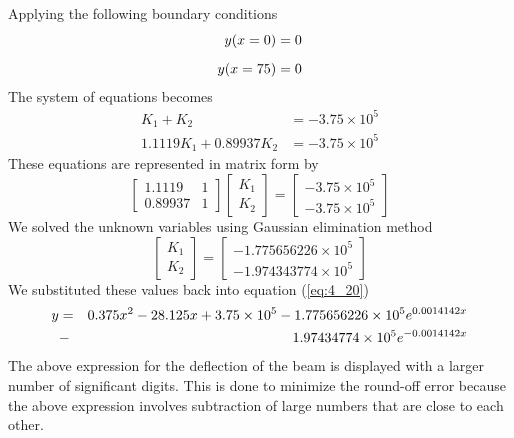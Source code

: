 \documentclass[12pt]{report}
\newcommand{\sps}{\\[0.2cm]}
\newcommand{\refn}[1]{(\ref{#1})}
\newcommand{\refx}[1]{\refn{eq:#1}}
\begin{document}
	Applying the following boundary conditions
	\begin{eqnarray}
		y(x=0) =0\notag\sps
		y(x=75) = 0\notag
	\end{eqnarray}
	The system of equations becomes
	\begin{align*}
		K_1 + K_2 &= -3.75 \times 10^5\sps
		1.1119K_1 + 0.89937K_2 &=-3.75 \times 10^5
	\end{align*}
	These equations are represented in matrix form by
	\begin{equation*}
		\begin{bmatrix}
			1.1119 & 1 \\
			0.89937 & 1 
		\end{bmatrix}
		\begin{bmatrix}
			K_1\\
			K_2
		\end{bmatrix}
		=
		\begin{bmatrix}
			-3.75 \times 10^5\\
			-3.75 \times 10^5
		\end{bmatrix}
	\end{equation*}
	We solved the unknown variables using Gaussian elimination method
	\begin{equation*}
		\begin{bmatrix}
			K_1\\
			K_2
		\end{bmatrix}
		=
		\begin{bmatrix}
			-1.775656226 \times 10^5\\
			-1.974343774 \times 10^5
		\end{bmatrix}
	\end{equation*}
	We substituted these values back into equation \refx{4_20}
	\begin{eqnarray}
		y &=& 0.375x^2 - 28.125x + 3.75 \times 10^5 - 1.775656226\times 10^5e^{0.0014142x}\notag\\
		&-& 1.97434774 \times 10^5 e^{-0.0014142x}\notag
	\end{eqnarray}
	The above expression for the deflection of the beam is displayed with a larger number of significant digits. This is done to minimize the round-off error because the above expression involves subtraction of large numbers that are close to each other.\\
	
\end{document}
